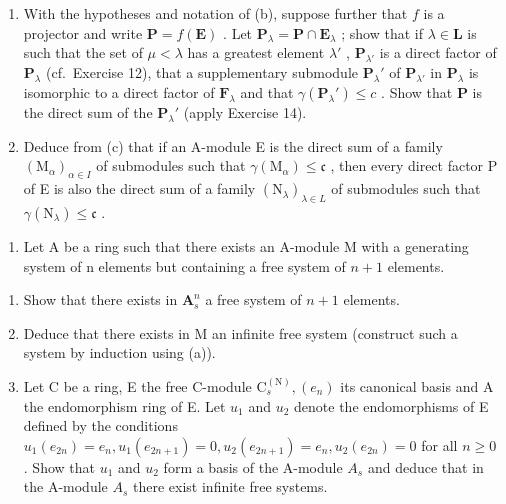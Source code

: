 \begin{enumerate}
\item
  With the hypotheses and notation of (b), suppose further that \(f\) is a projector and write \(\mathbf{P} = f(\mathbf{E})\) . Let \(\mathbf{P}_{\lambda} = \mathbf{P} \cap \mathbf{E}_{\lambda}\) ; show that if \(\lambda \in \mathbf{L}\) is such that the set of \(\mu < \lambda\) has a greatest element \(\lambda'\) , \(\mathbf{P}_{\lambda'}\) is a direct factor of \(\mathbf{P}_{\lambda}\) (cf.~Exercise 12), that a supplementary submodule \(\mathbf{P}_{\lambda}'\) of \(\mathbf{P}_{\lambda'}\) in \(\mathbf{P}_{\lambda}\) is isomorphic to a direct factor of \(\mathbf{F}_{\lambda}\) and that \(\gamma(\mathbf{P}_{\lambda}') \leqslant c\) . Show that \(\mathbf{P}\) is the direct sum of the \(\mathbf{P}_{\lambda}'\) (apply Exercise 14).
\item
  Deduce from (c) that if an A-module E is the direct sum of a family \((\mathrm{M}_{\alpha})_{\alpha\in I}\) of submodules such that \(\gamma(\mathrm{M}_{\alpha})\leqslant\mathfrak{c}\) , then every direct factor P of E is also the direct sum of a family \((\mathrm{N}_{\lambda})_{\lambda\in L}\) of submodules such that \(\gamma(\mathrm{N}_{\lambda})\leqslant\mathfrak{c}\) .
\end{enumerate}

\begin{enumerate}
\def\labelenumi{\arabic{enumi}.}
\setcounter{enumi}{15}
\tightlist
\item
  Let A be a ring such that there exists an A-module M with a generating system of n elements but containing a free system of \(n + 1\) elements.
\end{enumerate}

\begin{enumerate}
\def\labelenumi{(\alph{enumi})}
\item
  Show that there exists in \(\mathbf{A}_s^n\) a free system of \(n + 1\) elements.
\item
  Deduce that there exists in M an infinite free system (construct such a system by induction using (a)).
\item
  Let C be a ring, E the free C-module \(\mathrm{C}_{s}^{(\mathrm{N})}, (e_{n})\) its canonical basis and A the endomorphism ring of E. Let \(u_{1}\) and \(u_{2}\) denote the endomorphisms of E defined by the conditions \(u_{1}(e_{2n}) = e_{n}, u_{1}(e_{2n+1}) = 0, u_{2}(e_{2n+1}) = e_{n}, u_{2}(e_{2n}) = 0\) for all \(n \geqslant 0\) . Show that \(u_{1}\) and \(u_{2}\) form a basis of the A-module \(A_{s}\) and deduce that in the A-module \(A_{s}\) there exist infinite free systems.
\end{enumerate}

